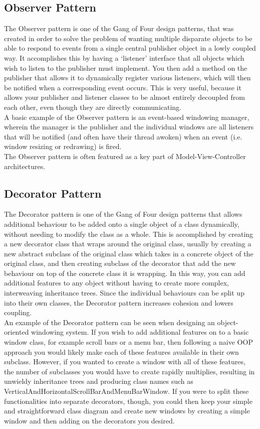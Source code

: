 \documentclass{article}
\begin{document}
    \subsection{Observer Pattern}
    The Observer pattern is one of the Gang of Four design patterns, that was
    created in order to solve the problem of wanting multiple disparate objects
    to be able to respond to events from a single central publisher object in a
    lowly coupled way. It accomplishes this by having a `listener' interface
    that all objects which wish to listen to the publisher must implement. You
    then add a method on the publisher that allows it to dynamically register
    various listeners, which will then be notified when a corresponding event
    occurs.  This is very useful, because it allows your publisher and listener
    classes to be almost entirely decoupled from each other, even though they
    are directly communicating.\\
    A basic example of the Observer pattern is an event-based windowing manager,
    wherein the manager is the publisher and the individual windows are all
    listeners that will be notified (and often have their thread awoken) when an
    event (i.e. window resizing or redrawing) is fired.\\
    The Observer pattern is often featured as a key part of
    Model-View-Controller architectures.
    \newpage
    \subsection{Decorator Pattern}
    The Decorator pattern is one of the Gang of Four design patterns that allows
    additional behaviour to be added onto a single object of a class
    dynamically, without needing to modify the class as a whole. This is
    accomplished by creating a new decorator class that wraps around the
    original class, usually by creating a new abstract subclass of the original
    class which takes in a concrete object of the original class, and then
    creating subclass of the decorator that add the new behaviour on top of the
    concrete class it is wrapping. In this way, you can add additional features
    to any object without having to create more complex, interweaving
    inheritance trees. Since the individual behaviours can be split up into
    their own classes, the Decorator pattern increases cohesion and lowers
    coupling.\\
    An example of the Decorator pattern can be seen when designing an
    object-oriented windowing system. If you wish to add additional features on
    to a basic window class, for example scroll bars or a menu bar, then
    following a naive OOP approach you would likely make each of these features
    available in their own subclass. However, if you wanted to create a window
    with all of these features, the number of subclasses you would have to
    create rapidly multiplies, resulting in unwieldy inheritance trees and
    producing class names such as
    VerticalAndHorizontalScrollBarAndMenuBarWindow. If you were to split these
    functionalities into separate decorators, though, you could then keep your
    simple and straightforward class diagram and create new windows by creating
    a simple window and then adding on the decorators you desired.
    \newpage
\end{document}
